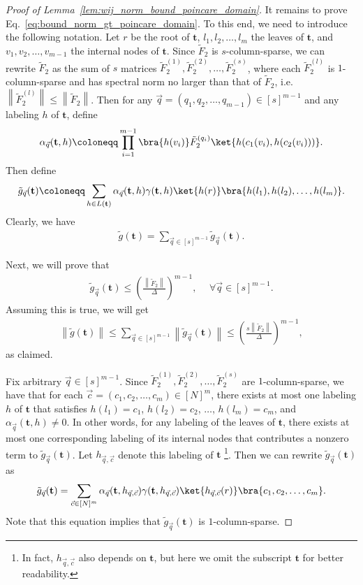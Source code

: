 \documentclass[superscriptaddress,onecolumn,nofootinbib,longbibliography,a4paper,accepted=2026-09-29]{quantumarticle}
\theoremstyle{plain}
\theoremstyle{definition}
\numberwithin{thm}{section}
\numberwithin{assumption}{section}
\numberwithin{lemma}{section}
\numberwithin{prop}{section}
\numberwithin{cor}{section}
\numberwithin{definition}{section}
\numberwithin{rmk}{section}
\numberwithin{equation}{section}
\newcommand{\norm}[1]     {\left\| #1 \right\|}
\newcommand{\lrb}[1]{\left ( #1 \right )}
\newcommand{\defeq}{\coloneqq}
\newcommand{\mbt}{\mathbf{t}}
\begin{document}
\begin{proof} [Proof of Lemma~\ref{lem:wij_norm_bound_poincare_domain}]
It remains to prove Eq.~\eqref{eq:bound_norm_gt_poincare_domain}. To this end, we need to introduce the following notation. Let $r$ be the root of $\mbt$, $l_1, l_2, \dots, l_m$ the leaves of $\mbt$, and 
$v_1,v_2,\dots,v_{m-1}$ the internal nodes of $\mbt$. Since $\tilde{F}_2$ is $s$-column-sparse, we can rewrite $\tilde{F}_2$ as the sum of $s$ matrices $\tilde{F}_2^{(1)}, \tilde{F}_2^{(2)}, \dots, \tilde{F}_2^{(s)}$, where each $\tilde{F}_2^{(l)}$ is $1$-column-sparse and has spectral norm no larger than that of  $\tilde{F}_2$, i.e. $\norm{\tilde{F}_2^{(l)}} \le \norm{\tilde{F}_2}$. Then for any $\vec{q}=(q_1,q_2,\dots,q_{m-1}) \in [s]^{m-1}$ and any labeling $h$ of $\mbt$, define
\begin{align}
\alpha_{\vec q}(\mbt, h) \defeq \prod_{i=1}^{m-1} \bra{h(v_i)} \tilde{F}_2^{(q_i)} \ket{h(c_1(v_i), h(c_2(v_i)))}.
\end{align}
Then define
\begin{align}
\tilde{g}_{\vec q}(\mbt) \defeq \sum_{h \in L(\mbt)} \alpha_{\vec q}(\mbt, h) \gamma(\mbt, h) 
\ket{h(r)}\bra{h(l_1), h(l_2),\dots, h(l_m)}.
\end{align}
Clearly, we have
\begin{align}
    \tilde{g}(\mbt)=\sum_{\vec q \in [s]^{m-1}} \tilde{g}_{\vec q}(\mbt).
\end{align}

Next, we will prove that 
\begin{align}
\tilde{g}_{\vec q}(\mbt) \le \lrb{\frac{\norm{\tilde{F}_2}}{\Delta}}^{m-1},~&~\forall \vec q \in [s]^{m-1}.    
\end{align}
Assuming this is true, we will get 
\begin{align}
    \norm{\tilde{g}(\mbt)}\le \sum_{\vec q \in [s]^{m-1}} \norm{\tilde{g}_{\vec q}(\mbt)} 
    \le \lrb{\frac{s\norm{\tilde{F}_2}}{\Delta}}^{m-1},
\end{align}
as claimed.

Fix arbitrary $\vec q \in [s]^{m-1}$. Since $\tilde{F}_2^{(1)}, \tilde{F}_2^{(2)}, \dots, \tilde{F}_2^{(s)}$ are $1$-column-sparse, we have that for each $\vec c= (c_1,c_2,\dots,c_m) \in [N]^m$, there exists at most one labeling $h$ of $\mbt$ that satisfies $h(l_1)=c_1$, $h(l_2)=c_2$, $\dots$, $h(l_m)=c_m$, and 
$\alpha_{\vec q}(\mbt, h) \neq 0$. In other words, for any labeling of the leaves of $\mbt$, there exists at most one corresponding labeling of its internal nodes that contributes a nonzero term to $\tilde{g}_{\vec q}(\mbt)$. Let $h_{\vec q, \vec c}$ denote this labeling of $\mbt$ \footnote{In fact, $h_{\vec q, \vec c}$ also depends on $\mbt$, but here we omit the subscript $\mbt$ for better readability.}. Then we can rewrite $\tilde{g}_{\vec q}(\mbt)$ as 
\begin{align}
    \tilde{g}_{\vec q}(\mbt) = \sum_{\vec c \in [N]^m} \alpha_{\vec q}(\mbt, h_{\vec q, \vec c}) \gamma(\mbt, h_{\vec q, \vec c}) \ket{h_{\vec q, \vec c}(r)}\bra{c_1,c_2,\dots,c_m}.
\end{align}
Note that this equation implies that $\tilde{g}_{\vec q}(\mbt)$ is $1$-column-sparse. 


\end{proof}
\end{document}
